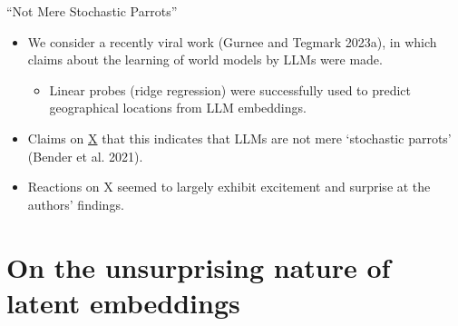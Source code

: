 \documentclass[
  10pt,
  ignorenonframetext,
  aspectratio=169,
  notheorems]{beamer}
\providecommand{\tightlist}{%
  \setlength{\itemsep}{0pt}\setlength{\parskip}{0pt}}\usepackage{longtable,booktabs,array}
\begin{document}
\begin{frame}{``Not Mere Stochastic Parrots''}
\label{not-mere-stochastic-parrots}
\begin{itemize}
\tightlist
\item
  We consider a recently viral work (Gurnee and Tegmark 2023a), in which
  claims about the learning of world models by LLMs were made.

  \begin{itemize}
  \tightlist
  \item
    Linear probes (ridge regression) were successfully used to predict
    geographical locations from LLM embeddings.
  \end{itemize}
\item
  Claims on
  \href{https://twitter.com/tegmark/status/1709572469978231063}{X} that
  this indicates that LLMs are not mere `stochastic parrots' (Bender et
  al. 2021).
\item
  Reactions on X seemed to largely exhibit excitement and surprise at
  the authors' findings.
\end{itemize}
\end{frame}

\section{On the unsurprising nature of latent
embeddings}\label{on-the-unsurprising-nature-of-latent-embeddings}
\end{document}
